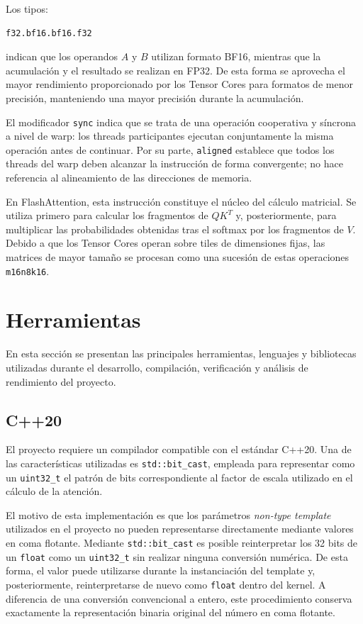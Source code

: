 Los tipos:

\begin{verbatim}
f32.bf16.bf16.f32
\end{verbatim}

indican que los operandos \(A\) y \(B\) utilizan formato BF16, mientras que la acumulación y el resultado se realizan en FP32. De esta forma se aprovecha el mayor rendimiento proporcionado por los Tensor Cores para formatos de menor precisión, manteniendo una mayor precisión durante la acumulación.

El modificador \texttt{sync} indica que se trata de una operación cooperativa y síncrona a nivel de warp: los threads participantes ejecutan conjuntamente la misma operación antes de continuar. Por su parte, \texttt{aligned} establece que todos los threads del warp deben alcanzar la instrucción de forma convergente; no hace referencia al alineamiento de las direcciones de memoria.

En FlashAttention, esta instrucción constituye el núcleo del cálculo matricial. Se utiliza primero para calcular los fragmentos de \(QK^T\) y, posteriormente, para multiplicar las probabilidades obtenidas tras el softmax por los fragmentos de \(V\). Debido a que los Tensor Cores operan sobre tiles de dimensiones fijas, las matrices de mayor tamaño se procesan como una sucesión de estas operaciones \texttt{m16n8k16}.

\section{Herramientas}

En esta sección se presentan las principales herramientas, lenguajes y bibliotecas utilizadas durante el desarrollo, compilación, verificación y análisis de rendimiento del proyecto.

\subsection{C++20}

El proyecto requiere un compilador compatible con el estándar C++20. Una de las características utilizadas es \texttt{std::bit_cast}, empleada para representar como un \texttt{uint32_t} el patrón de bits correspondiente al factor de escala utilizado en el cálculo de la atención.

El motivo de esta implementación es que los parámetros \textit{non-type template} utilizados en el proyecto no pueden representarse directamente mediante valores en coma flotante. Mediante \texttt{std::bit_cast} es posible reinterpretar los 32 bits de un \texttt{float} como un \texttt{uint32_t} sin realizar ninguna conversión numérica. De esta forma, el valor puede utilizarse durante la instanciación del template y, posteriormente, reinterpretarse de nuevo como \texttt{float} dentro del kernel. A diferencia de una conversión convencional a entero, este procedimiento conserva exactamente la representación binaria original del número en coma flotante.

